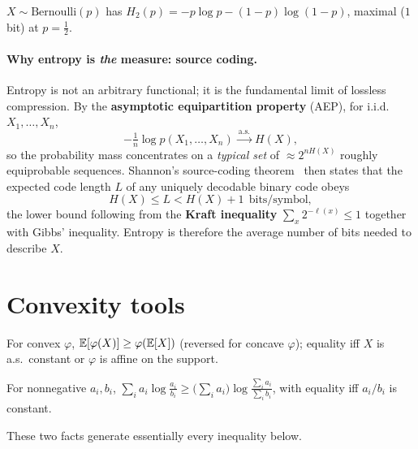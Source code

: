 \documentclass[11pt]{article}
\begin{document}
\begin{example}
$X\sim\mathrm{Bernoulli}(p)$ has $H_2(p)=-p\log p-(1-p)\log(1-p)$, maximal ($1$ bit) at $p=\tfrac12$.
\end{example}

\paragraph{Why entropy is \emph{the} measure: source coding.}
Entropy is not an arbitrary functional; it is the fundamental limit of lossless compression. By
the \textbf{asymptotic equipartition property} (AEP), for i.i.d.\ $X_1,\dots,X_n$,
\begin{equation}
  -\tfrac1n\log p(X_1,\dots,X_n)\xrightarrow{\ \text{a.s.}\ }H(X),
\end{equation}
so the probability mass concentrates on a \emph{typical set} of $\approx 2^{nH(X)}$ roughly
equiprobable sequences. Shannon's source-coding theorem~\cite{shannon1948,coverthomas} then states that the expected code length
$L$ of any uniquely decodable binary code obeys
\begin{equation}
  H(X)\le L < H(X)+1\ \ \text{bits/symbol},
\end{equation}
the lower bound following from the \textbf{Kraft inequality} $\sum_x 2^{-\ell(x)}\le1$ together
with Gibbs' inequality. Entropy is therefore the average number of bits needed to describe $X$.

\section{Convexity tools}
\begin{lemma}[Jensen]
For convex $\varphi$, $\mathbb{E}[\varphi(X)]\ge\varphi(\mathbb{E}[X])$ (reversed for concave $\varphi$); equality
iff $X$ is a.s.\ constant or $\varphi$ is affine on the support.
\end{lemma}
\begin{lemma}
For nonnegative $a_i,b_i$,
$\displaystyle\sum_i a_i\log\frac{a_i}{b_i}\ge\Big(\sum_i a_i\Big)\log\frac{\sum_i a_i}{\sum_i b_i}$,
with equality iff $a_i/b_i$ is constant.
\end{lemma}
These two facts generate essentially every inequality below.

\end{document}
